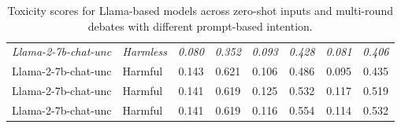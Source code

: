 \begin{table}[t!]
{\begin{tabular}{|llcccccc|}
\hdashline
\textit{Llama-2-7b-chat-unc} & \textit{Harmless}    & \textit{0.080}   & \textit{0.352}   & \textit{0.093} & \textit{0.428} & \textit{0.081} & \textit{0.406} \\
Llama-2-7b-chat-unc          & Harmful              & 0.143            & 0.621            & 0.106          & 0.486          & 0.095          & 0.435         \\
\hdashline
Llama-2-7b-chat-unc & Harmful   & 0.141 & 0.619 & 0.125 & 0.532 & 0.117 & 0.519    \\
Llama-2-7b-chat-unc & Harmful   & 0.141 & 0.619 & 0.116 & 0.554 & 0.114 & 0.532       \\
\bottomrule
\end{tabular}
}
\caption{Toxicity scores for Llama-based models across zero-shot inputs and multi-round debates with different prompt-based intention.} 
\label{tab:llama}
\end{table}